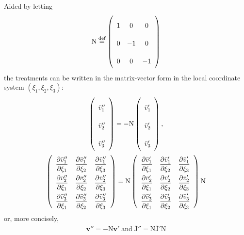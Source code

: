 \documentclass[a4paper,12pt,dvips]{article}
\newcommand*\defeq{\buildrel{\text{def}}\over{=}}
\begin{document}
Aided by letting
\begin{align*}
  \mathrm{N} \defeq \left(\begin{array}{ccc}
    1 & 0 & 0 \\ 0 & -1 & 0 \\ 0 & 0 & -1
  \end{array}\right)
\end{align*}
the treatments can be written in the matrix-vector form in the local coordinate
system $(\xi_1, \xi_2, \xi_3)$:
\begin{gather*}
  \left(\begin{array}{c}
    \bar{v}''_1 \\ \bar{v}''_2 \\ \bar{v}''_3
  \end{array}\right)
  = -\mathrm{N}
    \left(\begin{array}{c}
      \bar{v}'_1 \\ \bar{v}'_2 \\ \bar{v}'_3
    \end{array}\right),
  \\
  \renewcommand{\arraystretch}{2.2}
  \left(\begin{array}{ccc}
    \dfrac{\partial \bar{v}''_1}{\partial\xi_1} &
    \dfrac{\partial \bar{v}''_1}{\partial\xi_2} &
    \dfrac{\partial \bar{v}''_1}{\partial\xi_3} \\
    \dfrac{\partial \bar{v}''_2}{\partial\xi_1} &
    \dfrac{\partial \bar{v}''_2}{\partial\xi_2} &
    \dfrac{\partial \bar{v}''_2}{\partial\xi_3} \\
    \dfrac{\partial \bar{v}''_3}{\partial\xi_1} &
    \dfrac{\partial \bar{v}''_3}{\partial\xi_2} &
    \dfrac{\partial \bar{v}''_3}{\partial\xi_3}
  \end{array}\right)
  = \mathrm{N}
  \left(\begin{array}{ccc}
    \dfrac{\partial \bar{v}'_1}{\partial\xi_1} &
    \dfrac{\partial \bar{v}'_1}{\partial\xi_2} &
    \dfrac{\partial \bar{v}'_1}{\partial\xi_3} \\
    \dfrac{\partial \bar{v}'_2}{\partial\xi_1} &
    \dfrac{\partial \bar{v}'_2}{\partial\xi_2} &
    \dfrac{\partial \bar{v}'_2}{\partial\xi_3} \\
    \dfrac{\partial \bar{v}'_3}{\partial\xi_1} &
    \dfrac{\partial \bar{v}'_3}{\partial\xi_2} &
    \dfrac{\partial \bar{v}'_3}{\partial\xi_3}
  \end{array}\right)
  \mathrm{N}
\end{gather*}
or, more concisely,
\begin{align*}
  \bar{\mathbf{v}}'' = -\mathrm{N}\bar{\mathbf{v}}'
  \; \mbox{and} \;
  \bar{\mathrm{J}}'' = \mathrm{N\bar{J}'N}
\end{align*}
\end{document}
